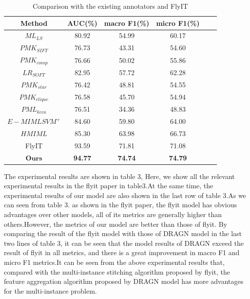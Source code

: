 \documentclass[10pt,twocolumn,letterpaper]{article}
\begin{document}
\begin{table}
\footnotesize
\begin{center}
\begin{tabular}{|c|c|c|c|c|c|}
\hline
Method & AUC(\%) & macro F1(\%)  & micro F1(\%)\\
\hline\hline
$ML_{LS}$ & 80.92 & 54.99 & 60.17 \\
$PMK_{SIFT}$ & 76.73 & 43.31 & 54.60 \\
$PMK_{comp}$ & 76.66 & 50.02 & 55.86 \\
$LR_{SOFT}$ & 82.95 & 57.72 & 62.28 \\
$PMK_{star}$ & 76.42 & 48.81 & 54.55 \\

$PMK_{clique}$ & 76.58 & 45.70 & 54.94 \\
$PML_{kcca}$ & 76.51 & 34.36 & 48.83 \\
$E-MIMLSVM^{+}$ & 84.60 & 59.80 & 64.00 \\
$HMIML$ & 85.30 & 63.98 & 66.73 \\
FlyIT & 93.59 & 71.81 & 71.08 \\ \hline 
$\textbf{Ours}$ & \textbf{94.77} & \textbf{74.74} & \textbf{74.79} \\
\hline
\end{tabular}
\end{center}
\caption{Comparison with the existing annotators and FlyIT}
\end{table}

The experimental results are shown in table 3, Here, we show all the relevant experimental results in the flyit paper in table3.At the same time, the experimental results of our model are also shown in the last row of table 3.As we can seen from table 3. as shown in the flyit paper, the flyit model has obvious advantages over other models, all of its metrics are generally higher than others.However, the metrics of our model are better than those of flyit. By comparing the result of the flyit model with those of DRAGN model in the last two lines of table 3, it can be seen that the model results of DRAGN exceed the result of flyit in all metrics, and there is a great improvement in macro F1 and micro F1 metrics.It can be seen from the above experimental results that, compared with the multi-instance stitching algorithm proposed by flyit, the feature aggregation algorithm proposed by DRAGN model has more advantages for the multi-instance problem.

\end{document}

